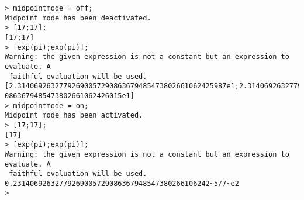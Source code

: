 \begin{center}\begin{minipage}{15cm}\begin{Verbatim}[frame=single]
> midpointmode = off;
Midpoint mode has been deactivated.
> [17;17];
[17;17]
> [exp(pi);exp(pi)];
Warning: the given expression is not a constant but an expression to evaluate. A
 faithful evaluation will be used.
[2.31406926327792690057290863679485473802661062425987e1;2.3140692632779269005729
0863679485473802661062426015e1]
> midpointmode = on;
Midpoint mode has been activated.
> [17;17];
[17]
> [exp(pi);exp(pi)];
Warning: the given expression is not a constant but an expression to evaluate. A
 faithful evaluation will be used.
0.23140692632779269005729086367948547380266106242~5/7~e2
> 
\end{Verbatim}
\end{minipage}\end{center}
